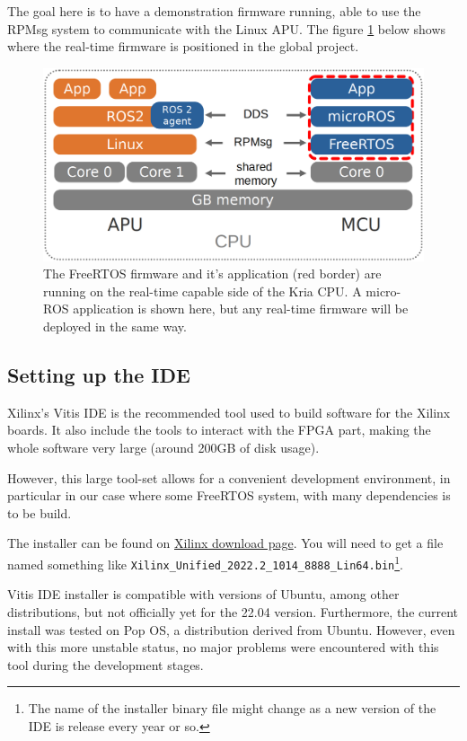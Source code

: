 \documentclass[10pt]{article}
\begin{document}
The goal here is to have a demonstration firmware running,
able to use the RPMsg system to communicate with the Linux APU.
The figure \ref{fig:org89f6280} below shows where the real-time firmware
is positioned in the global project.

\begin{figure}[htbp]
\centering
\includegraphics[width=.6\textwidth]{./img/map_microros.png}
\caption{\label{fig:org89f6280}The FreeRTOS firmware and it's application (red border) are running on the real-time capable side of the Kria CPU. A micro-ROS application is shown here, but any real-time firmware will be deployed in the same way.}
\end{figure}

\subsection{Setting up the IDE}
\label{sec:orga924522}
Xilinx's Vitis IDE is the recommended tool used to build software for the Xilinx boards.
It also include the tools to interact with the FPGA part, making the whole
software very large (around 200GB of disk usage).

However, this large tool-set allows for a convenient development environment, in particular
in our case where some FreeRTOS system, with many dependencies is to be build.

The installer can be found on \href{https://www.xilinx.com/support/download/index.html/content/xilinx/en/downloadNav/vitis.html}{Xilinx download page}. You will need to get
a file named something like \texttt{Xilinx\_Unified\_2022.2\_1014\_8888\_Lin64.bin}\footnote{The name of the installer binary file might change as a new version of the IDE
is release every year or so.}.

Vitis IDE installer is compatible with versions of Ubuntu, among other distributions,
but not officially yet for the 22.04 version.
Furthermore, the current install was tested on Pop OS, a distribution derived from Ubuntu.
However, even with this more unstable status, no major problems were encountered
with this tool during the development stages.
\end{document}
